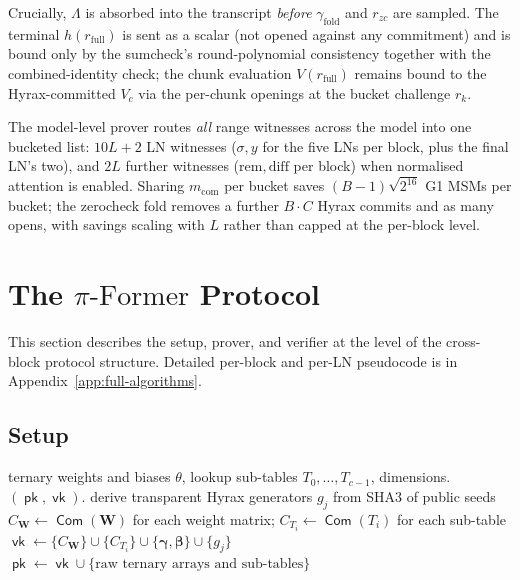 \documentclass[letterpaper,twocolumn,10pt]{article}
\theoremstyle{remark}
\theoremstyle{definition}
\newcommand{\sys}{\ensuremath{\pi\text{-Former}}}
\newcommand{\bW}{\mathbf{W}}
\newcommand{\bbeta}{\boldsymbol{\beta}}
\newcommand{\bgamma}{\boldsymbol{\gamma}}
\newcommand{\chunks}{c}
\DeclareMathOperator{\Com}{\mathsf{Com}}
\DeclareMathOperator{\Setup}{\mathsf{Setup}}
\DeclareMathOperator{\poppk}{\mathsf{pk}}
\DeclareMathOperator{\popvk}{\mathsf{vk}}
\begin{document}
Crucially, $\Lambda$ is absorbed into the transcript \emph{before}
$\gamma_{\mathrm{fold}}$ and $r_{zc}$ are sampled. The terminal
$h(r_{\mathrm{full}})$ is sent as a scalar (not opened against any
commitment) and is bound only by the sumcheck's round-polynomial
consistency together with the combined-identity check; the chunk
evaluation $V(r_{\mathrm{full}})$ remains bound to the Hyrax-committed
$V_c$ via the per-chunk openings at the bucket challenge $r_k$.

The model-level prover routes \emph{all} range witnesses across the
model into one bucketed list: $10L\!+\!2$ LN witnesses
($\sigma,y$ for the five LNs per block, plus the final LN's two), and
$2L$ further witnesses ($\mathrm{rem},\mathrm{diff}$ per block) when
normalised attention is enabled. Sharing $m_{\mathrm{com}}$ per
bucket saves $(B\!-\!1)\sqrt{2^{16}}$ G1 MSMs per bucket; the
zerocheck fold removes a further $B\!\cdot\!C$ Hyrax commits and as
many opens, with savings scaling with $L$ rather than capped at the
per-block level.

\section{The \texorpdfstring{\sys{}}{Pi-Former} Protocol}
\label{sec:protocol}

This section describes the setup, prover, and verifier at the level of
the cross-block protocol structure. Detailed per-block and per-LN
pseudocode is in Appendix~\ref{app:full-algorithms}.

\subsection{Setup}

\begin{algorithm}[H]
\caption{$\sys{}.\Setup(\theta)$}
\label{alg:setup}
\begin{algorithmic}[1]
\Require ternary weights and biases $\theta$, lookup sub-tables
$T_0,\dots,T_{\chunks-1}$, dimensions.
\Ensure $(\poppk,\popvk)$.
\State derive transparent Hyrax generators $g_j$ from SHA3 of public seeds
\State $C_\bW\!\gets\!\Com(\bW)$ for each weight matrix;\;
       $C_{T_i}\!\gets\!\Com(T_i)$ for each sub-table
\State $\popvk\!\gets\!\{C_\bW\}\cup\{C_{T_i}\}\cup\{\bgamma,\bbeta\}\cup\{g_j\}$
\State $\poppk\!\gets\!\popvk\cup\{\text{raw ternary arrays and sub-tables}\}$
\end{algorithmic}
\end{algorithm}
\end{document}
